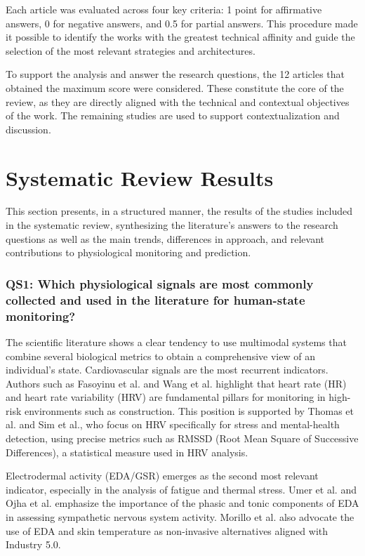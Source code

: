 \documentclass[runningheads]{llncs}
\begin{document}
Each article was evaluated across four key criteria: 1 point for affirmative answers, 0 for negative answers, and 0.5 for partial answers. This procedure made it possible to identify the works with the greatest technical affinity and guide the selection of the most relevant strategies and architectures. %

To support the analysis and answer the research questions, the 12 articles that obtained the maximum score were considered. These constitute the core of the review, as they are directly aligned with the technical and contextual objectives of the work. The remaining studies are used to support contextualization and discussion.

\section{Systematic Review Results}

This section presents, in a structured manner, the results of the studies included in the systematic review, synthesizing the literature's answers to the research questions as well as the main trends, differences in approach, and relevant contributions to physiological monitoring and prediction.

\subsubsection*{QS1: Which physiological signals are most commonly collected and used in the literature for human-state monitoring?}
\label{subsec:qs1}

The scientific literature shows a clear tendency to use multimodal systems that combine several biological metrics to obtain a comprehensive view of an individual's state. Cardiovascular signals are the most recurrent indicators. Authors such as Fasoyinu et al. and Wang et al. \cite{fasoyinu2025,wang2024} highlight that heart rate (HR) and heart rate variability (HRV) are fundamental pillars for monitoring in high-risk environments such as construction. This position is supported by Thomas et al. and Sim et al.\cite{thomas2025,sim2023}, who focus on HRV specifically for stress and mental-health detection, using precise metrics such as RMSSD (Root Mean Square of Successive Differences), a statistical measure used in HRV analysis.

Electrodermal activity (EDA/GSR) emerges as the second most relevant indicator, especially in the analysis of fatigue and thermal stress. Umer et al. and Ojha et al. \cite{umer2025,ojha2024} emphasize the importance of the phasic and tonic components of EDA in assessing sympathetic nervous system activity. Morillo et al. \cite{albarran2025} also advocate the use of EDA and skin temperature as non-invasive alternatives aligned with Industry 5.0.
\end{document}
